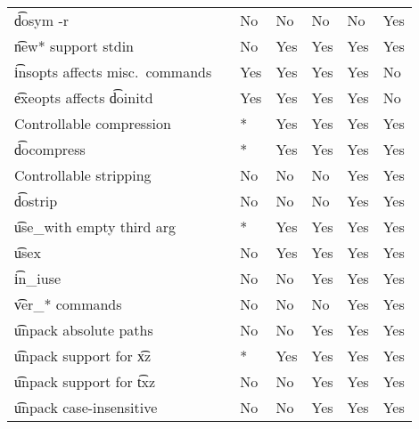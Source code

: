 \begin{landscape}
\begin{longtable}{llP{7.5em}P{7.5em}P{7.5em}P{7.5em}P{7.5em}}
\t{dosym -r} &  &
    No & No & No & No & Yes \\

\t{new*} support stdin &  &
    No & Yes & Yes & Yes & Yes \\

\t{insopts} affects misc.\ commands &  &
    Yes & Yes & Yes & Yes & No \\

\t{exeopts} affects \t{doinitd} &  &
    Yes & Yes & Yes & Yes & No \\

Controllable compression &  &
    * & Yes & Yes & Yes & Yes \\

\t{docompress} &  &
    * & Yes & Yes & Yes & Yes \\

Controllable stripping &  &
    No & No & No & Yes & Yes \\

\t{dostrip} &  &
    No & No & No & Yes & Yes \\

\t{use_with} empty third arg &  &
    * & Yes & Yes & Yes & Yes \\

\t{usex} &  &
    No & Yes & Yes & Yes & Yes \\

\t{in_iuse} &  &
    No & No & Yes & Yes & Yes \\

\t{ver_*} commands &  &
    No & No & No & Yes & Yes \\

\t{unpack} absolute paths &  &
    No & No & Yes & Yes & Yes \\

\t{unpack} support for \t{xz} &  &
    * & Yes & Yes & Yes & Yes \\

\t{unpack} support for \t{txz} &  &
    No & No & Yes & Yes & Yes \\

\t{unpack} case-insensitive &  &
    No & No & Yes & Yes & Yes \\


\end{longtable}
\end{landscape}
